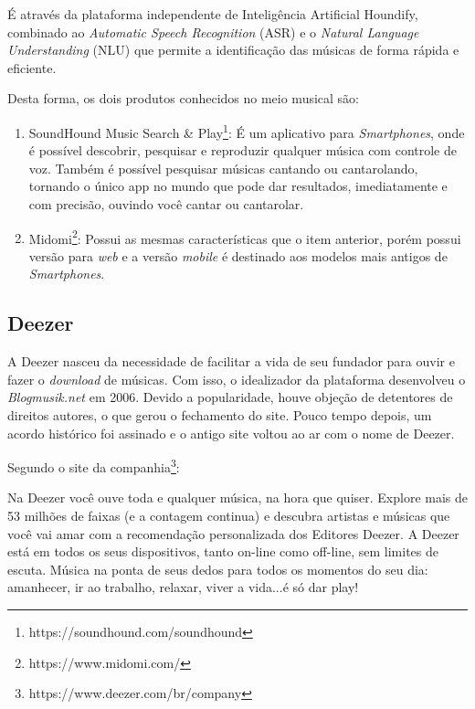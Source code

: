 É através da plataforma independente de Inteligência Artificial Houndify, combinado ao \textit{Automatic Speech Recognition} (ASR) e o \textit{Natural Language Understanding} (NLU) que permite a identificação das músicas de forma rápida e eficiente.

Desta forma, os dois produtos conhecidos no meio musical são:

\begin{enumerate}
    \item SoundHound Music Search \& Play\footnote{https://soundhound.com/soundhound}: É um aplicativo para \textit{Smartphones}, onde é possível descobrir, pesquisar e reproduzir qualquer música com controle de voz. Também é possível pesquisar músicas cantando ou cantarolando, tornando o único app no mundo que pode dar resultados, imediatamente e com precisão, ouvindo você cantar ou cantarolar.
    \item Midomi\footnote{https://www.midomi.com/}: Possui as mesmas características que o item anterior, porém possui versão para \textit{web} e a versão \textit{mobile} é destinado aos modelos mais antigos de \textit{Smartphones}.
\end{enumerate}

\subsection{Deezer}
A Deezer nasceu da necessidade de facilitar a vida de seu fundador para ouvir e fazer o \textit{download} de músicas. Com isso, o idealizador da plataforma desenvolveu o \textit{Blogmusik.net} em 2006. Devido a popularidade, houve objeção de detentores de direitos autores, o que gerou o fechamento do site. Pouco tempo depois, um acordo histórico foi assinado e o antigo site voltou ao ar com o nome de Deezer.

Segundo o site da companhia\footnote{https://www.deezer.com/br/company}:

\begin{citacao}
Na Deezer você ouve toda e qualquer música, na hora que quiser. Explore mais de 53 milhões de faixas (e a contagem continua) e descubra artistas e músicas que você vai amar com a recomendação personalizada dos Editores Deezer. A Deezer está em todos os seus dispositivos, tanto on-line como off-line, sem limites de escuta. Música na ponta de seus dedos para todos os momentos do seu dia: amanhecer, ir ao trabalho, relaxar, viver a vida...é só dar play! \cite{deezer2006}
\end{citacao}

